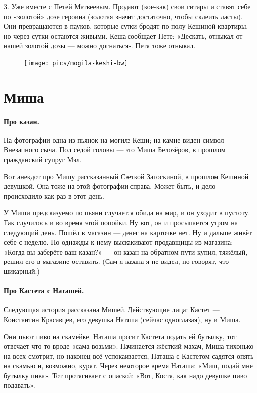 \documentclass{book}
\begin{document}
3. Уже вместе с Петей Матвеевым.
Продают (кое-как) свои гитары и ставят себе по «золотой» дозе героина (золотая значит достаточно, чтобы склеить ласты).
Они превращаются в пауков, которые сутки бродят по полу Кешиной квартиры, но через сутки остаются живыми.
Кеша сообщает Пете: «Дескать, отныкал от нашей золотой дозы --- можно догнаться».
Петя тоже отныкал.

{

\begin{figure}
\vskip-10mm
\centering
\texttt{[image: pics/mogila-keshi-bw]}
\end{figure}

\section*{Миша}

\paragraph{Про казан.}
На фотографии одна из пьянок на могиле Кеши;
на камне виден символ Внезапного сыча.
Пол седой головы --- это Миша Белозёров, в прошлом гражданский супруг Мэл.

Вот анекдот про Мишу рассказанный Светкой Загоскиной, в прошлом Кешиной девушкой.
Она тоже на этой фотографии справа.
Может быть, и дело происходило как раз в этот день.

}

У Миши предсказуемо по пьяни случается обида на мир, и он уходит в пустоту.
Так случилось и во время этой попойки.
Ну вот, он и просыпается утром на следующий день.
Пошёл в магазин --- денег на карточке нет.
Ну и дальше живёт себе с неделю.
Но однажды к нему выскакивают продавщицы из магазина: «Когда вы заберёте ваш казан?» --- он казан на обратном пути купил, тяжёлый, решил его в магазине оставить.
(Сам я казана я не видел, но говорят, что шикарный.)




\paragraph{Про Кастета с Наташей.}
Следующая история рассказана Мишей.
Действующие лица: Кастет --- Константин Красавцев, его девушка Наташа (сейчас одноглазая), ну и Миша.

Они пьют пиво на скамейке.
Наташа просит Кастета подать ей бутылку, тот отвечает что-то вроде «сама возьми».
Начинается жёсткий махач, Миша тихонько на всех смотрит, но наконец всё успокаивается, Наташа с Кастетом садятся опять на скамью и, возможно, курят.
Через некоторое время Наташа: «Миш, подай мне бутылку пива».
Тот протягивает с опаской: «Вот, Костя, как надо девушке пиво подавать».
\end{document}
